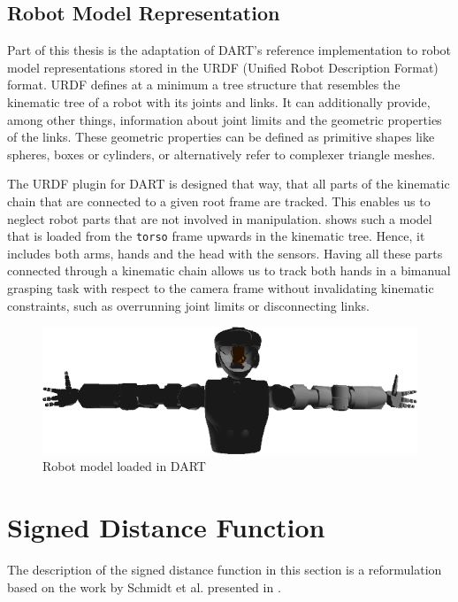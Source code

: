 \subsection{Robot Model Representation}

Part of this thesis is the adaptation of DART's reference implementation to robot model representations stored in the URDF (Unified Robot Description Format) format. URDF defines at a minimum a tree structure that resembles the kinematic tree of a robot with its joints and links. It can additionally provide, among other things, information about joint limits and the geometric properties of the links. These geometric properties can be defined as primitive shapes like spheres, boxes or cylinders, or alternatively refer to complexer triangle meshes.

The URDF plugin for DART is designed that way, that all parts of the kinematic chain that are connected to a given root frame are tracked. This enables us to neglect robot parts that are not involved in manipulation.  shows such a model that is loaded from the \texttt{torso} frame upwards in the kinematic tree. Hence, it includes both arms, hands and the head with the sensors.
Having all these parts connected through a kinematic chain allows us to track both hands in a bimanual grasping task with respect to the camera frame without invalidating kinematic constraints, such as overrunning joint limits or disconnecting links.

\begin{figure}[h]
\centering
\includegraphics[width=\textwidth]{images/valkyrie/val_model_torso_dart.png}
\caption{Robot model loaded in DART}
\label{fig:val_model_dart}
\end{figure}


\section{Signed Distance Function}

The description of the signed distance function in this section is a reformulation based on the work by Schmidt et al. presented in \cite{Schmidt2015}.

